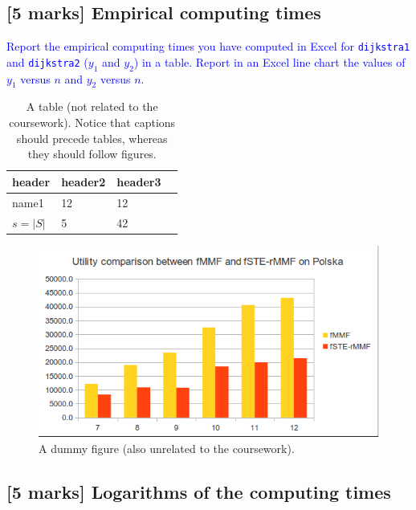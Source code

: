 \documentclass[a4paper]{article}
\numberwithin{equation}{section} %
\begin{document}
\subsection{[5 marks] Empirical computing times}

\textcolor{blue}{
  Report the empirical computing times you have computed in Excel for {\tt dijkstra1} and {\tt dijkstra2} ($y_1$ and $y_2$) in a table.
  Report in an Excel line chart the values of $y_1$ versus $n$ and $y_2$ versus $n$.
}

\begin{table}[h!]
  \caption{A table (not related to the coursework). Notice that captions should precede tables, whereas they should follow figures.}
  \begin{center}
\begin{tabular}{l|lll}
  header    & header2 & header3 \\
  \hline
  name1     & 12      & 12\\
  $s = |S|$ & 5       & 42
\end{tabular}
  \end{center}
\label{tab:1}
\end{table}


\begin{figure}[h!]
  \begin{center}
    \includegraphics[scale=0.5]{./dummy.png}
  \end{center}
  \caption{A dummy figure (also unrelated to the coursework).}
  \label{fig:a_figure}
\end{figure}

\subsection{[5 marks] Logarithms of the computing times}
\end{document}
